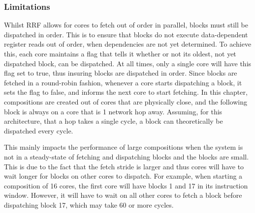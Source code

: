 
\subsubsection{Limitations}

Whilst RRF allows for cores to fetch out of order in parallel, blocks must still be dispatched in order.
This is to ensure that blocks do not execute data-dependent register reads out of order, when dependencies are not yet determined.
To achieve this, each core maintains a flag that tells it whether or not its oldest, not yet dispatched block, can be dispatched.
At all times, only a single core will have this flag set to true, thus insuring blocks are dispatched in order.
Since blocks are fetched in a round-robin fashion, whenever a core starts dispatching a block, it sets the flag to false, and informs the next core to start fetching.
In this chapter, compositions are created out of cores that are physically close, and the following block is always on a core that is 1 network hop away.
Assuming, for this architecture, that a hop takes a single cycle, a block can theoretically be dispatched every cycle.


This mainly impacts the performance of large compositions when the system is not in a steady-state of fetching and dispatching blocks and the blocks are small.
This is due to the fact that the fetch stride is larger and thus cores will have to wait longer for blocks on other cores to dispatch.
For example, when starting a composition of 16 cores, the first core will have blocks 1 and 17 in its instruction window.
However, it will have to wait on all other cores to fetch a block before dispatching block 17, which may take 60 or more cycles.

